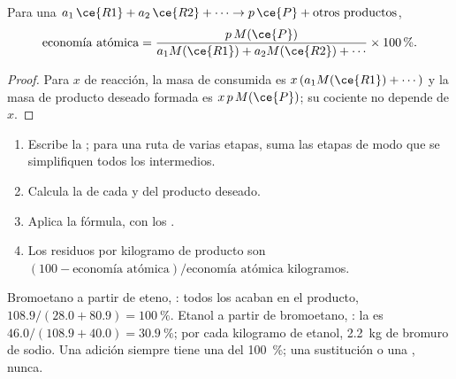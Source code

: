 \begin{proposition}\label{prop:g12:synthesis-strategy:atom-economy}
Para una  $a_1\,\ce{R1} + a_2\,\ce{R2} + \cdots \rightarrow
p\,\ce{P} + \text{otros productos}$,
\[
  \text{economía atómica} =
  \frac{p\,M(\ce{P})}{a_1 M(\ce{R1}) + a_2 M(\ce{R2}) + \cdots}
  \times 100\,\% .
\]
\end{proposition}

\begin{proof}
Para $x$  de reacción, la masa de  consumida es
$x\,(a_1 M(\ce{R1}) + \cdots)$ y la masa de producto deseado formada es
$x\,p\,M(\ce{P})$; su cociente no depende de $x$.
\end{proof}

\begin{method}\label{met:g12:synthesis-strategy:atom-economy}
\begin{enumerate}
  \item Escribe la ; para una ruta de varias etapas,
        suma las etapas de modo que se simplifiquen todos los
        intermedios.
  \item Calcula la  de cada  y del producto deseado.
  \item Aplica la fórmula, con los .
  \item Los residuos por kilogramo de producto son
        $(100 - \text{economía atómica})/\text{economía atómica}$ kilogramos.
\end{enumerate}
\end{method}

\begin{example}\label{ex:g12:synthesis-strategy:compare}
Bromoetano a partir de eteno, : todos los
 acaban en el producto, 
$108.9/(28.0 + 80.9) = \qty{100}{\percent}$. Etanol a partir de
bromoetano, : la  es
$46.0/(108.9 + 40.0) = \qty{30.9}{\percent}$; por cada kilogramo de
etanol, \qty{2.2}{kg} de bromuro de sodio. Una adición siempre tiene una
 del \qty{100}{\percent}; una sustitución o una
, nunca.
\end{example}

